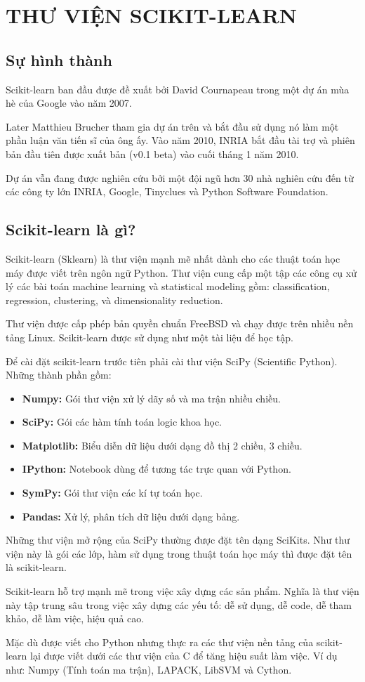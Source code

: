 \chapter{THƯ VIỆN SCIKIT-LEARN}

\section{Sự hình thành}
Scikit-learn ban đầu được đề xuất bởi David Cournapeau trong
một dự án mùa hè của Google vào năm 2007.

Later Matthieu Brucher tham gia dự án trên và bắt đầu sử dụng
nó làm một phần luận văn tiến sĩ của ông ấy.
Vào năm 2010, INRIA bắt đầu tài trợ và phiên bản đầu tiên được
xuất bản (v0.1 beta) vào cuối tháng 1 năm 2010.

Dự án vẫn đang được nghiên cứu bởi một đội ngũ hơn 30 nhà nghiên cứu
đến từ các công ty lớn INRIA, Google, Tinyclues và Python Software Foundation.

\section{Scikit-learn là gì?}
Scikit-learn (Sklearn) là thư viện mạnh mẽ nhất dành cho các thuật toán
học máy được viết trên ngôn ngữ Python. Thư viện cung cấp một tập các công cụ
xử lý các bài toán machine learning và statistical modeling gồm:
classification, regression, clustering, và dimensionality reduction.

Thư viện được cấp phép bản quyền chuẩn FreeBSD và chạy được trên
nhiều nền tảng Linux. Scikit-learn được sử dụng như một tài liệu để học tập.

Để cài đặt scikit-learn trước tiên phải cài thư viện SciPy (Scientific Python).
Những thành phần gồm:

\begin{itemize}
    \item \textbf{Numpy:} Gói thư viện xử lý dãy số và ma trận nhiều chiều.
    \item \textbf{SciPy:} Gói các hàm tính toán logic khoa học.
    \item \textbf{Matplotlib:} Biểu diễn dữ liệu dưới dạng đồ thị 2 chiều, 3 chiều.
    \item \textbf{IPython:} Notebook dùng để tương tác trực quan với Python.
    \item \textbf{SymPy:} Gói thư viện các kí tự toán học.
    \item \textbf{Pandas:} Xử lý, phân tích dữ liệu dưới dạng bảng.
\end{itemize}

Những thư viện mở rộng của SciPy thường được đặt tên dạng SciKits.
Như thư viện này là gói các lớp, hàm sử dụng trong thuật toán học máy
thì được đặt tên là scikit-learn.

Scikit-learn hỗ trợ mạnh mẽ trong việc xây dựng các sản phẩm.
Nghĩa là thư viện này tập trung sâu trong việc xây dựng các yếu tố:
dễ sử dụng, dễ code, dễ tham khảo, dễ làm việc, hiệu quả cao.

Mặc dù được viết cho Python nhưng thực ra các thư viện nền tảng
của scikit-learn lại được viết dưới các thư viện của C để tăng
hiệu suất làm việc.
Ví dụ như: Numpy (Tính toán ma trận), LAPACK, LibSVM và Cython.
